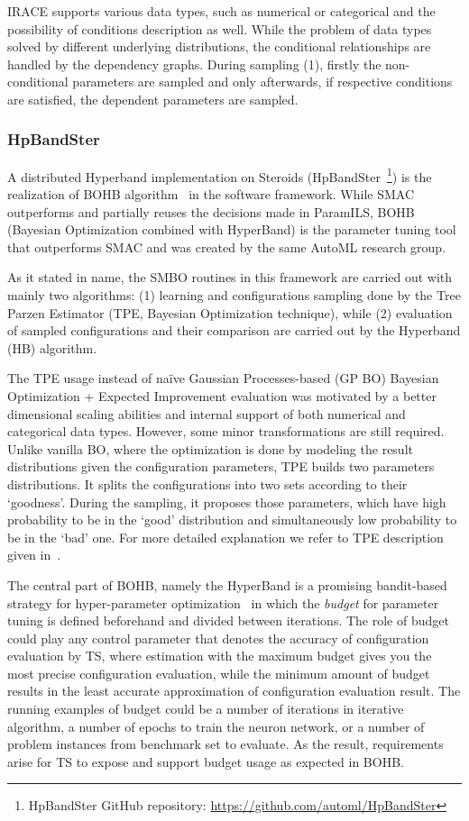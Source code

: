 IRACE supports various data types, such as numerical or categorical and the possibility of conditions description as well. While the problem of data types solved by different underlying distributions, the conditional relationships are handled by the dependency graphs. During sampling (1), firstly the non-conditional parameters are sampled and only afterwards, if respective conditions are satisfied, the dependent parameters are sampled.


\subsubsection{HpBandSter}\label{bg: bohb}
A distributed Hyperband implementation on Steroids (HpBandSter~\footnote{HpBandSter GitHub repository: \url{https://github.com/automl/HpBandSter}}) is the realization of BOHB algorithm~\cite{falkner2018bohb} in the software framework.
While SMAC outperforms and partially reuses the decisions made in ParamILS, BOHB (Bayesian Optimization combined with HyperBand) is the parameter tuning tool that outperforms SMAC and was created by the same AutoML research group.

As it stated in name, the SMBO routines in this framework are carried out with mainly two algorithms: (1) learning and configurations sampling done by the Tree Parzen Estimator (TPE, Bayesian Optimization technique), while (2) evaluation of sampled configurations and their comparison are carried out by the Hyperband (HB) algorithm.

The TPE usage instead of na\"ive Gaussian Processes-based (GP BO) Bayesian Optimization + Expected Improvement evaluation was motivated by a better dimensional scaling abilities and internal support of both numerical and categorical data types. However, some minor transformations are still required.
Unlike vanilla BO, where the optimization is done by modeling the result distributions given the configuration parameters, TPE builds two parameters distributions. It splits the configurations into two sets according to their `goodness'. During the sampling, it proposes those parameters, which have high probability to be in the `good' distribution and simultaneously low probability to be in the `bad' one. For more detailed explanation we refer to TPE description given in~\cite{bergstra2011algorithms}.

The central part of BOHB, namely the HyperBand is a promising bandit-based strategy for hyper-parameter optimization~\cite{li2017hyperband} in which the \emph{budget} for parameter tuning is defined beforehand and divided between iterations. The role of budget could play any control parameter that denotes the accuracy of configuration evaluation by TS, where estimation with the maximum budget gives you the most precise configuration evaluation, while the minimum amount of budget results in the least accurate approximation of configuration evaluation result.
The running examples of budget could be a number of iterations in iterative algorithm, a number of epochs to train the neuron network, or a number of problem instances from benchmark set to evaluate. As the result, requirements arise for TS to expose and support budget usage as expected in BOHB.

